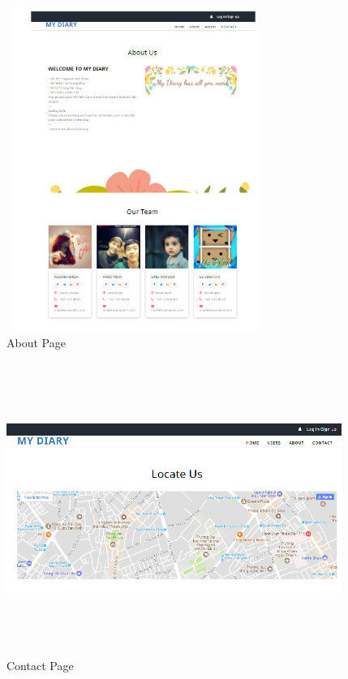 \documentclass[a4paper]{article}
\begin{document}
\begin{enumerate}
	\begin{figure}[!h]
	 			\centering
      			\includegraphics[height=300pt,width=240pt]{Images/h9.png}
	 		 	\caption{About Page}
	 		 	\label{mainbook9}
	  		\end{figure}


	\begin{figure}[!h]
	 			\centering
      			\includegraphics[height=270pt,width=310pt]{Images/h10.png}
	 		 	\caption{Contact Page}
	 		 	\label{mainbook10}
	  		\end{figure}



\end{enumerate}
\end{document}
